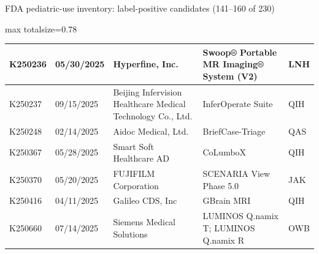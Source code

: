 \documentclass[aspectratio=169]{beamer}
\begin{document}
\begin{frame}[category=FDA appendix]{FDA pediatric-use inventory: label-positive candidates (141--160 of 230)}
\begin{adjustbox}{max totalsize={\textwidth}{0.78\textheight}}
\begin{tabular}{|p{}|p{}|p{}|p{}|p{}|}
K250236 & 05/30/2025 & Hyperfine, Inc. & Swoop® Portable MR Imaging® System (V2) & LNH \\ \hline
K250237 & 09/15/2025 & Beijing Infervision Healthcare Medical Technology Co., Ltd. & InferOperate Suite & QIH \\ \hline
K250248 & 02/14/2025 & Aidoc Medical, Ltd. & BriefCase-Triage & QAS \\ \hline
K250367 & 05/28/2025 & Smart Soft Healthcare AD & CoLumboX & QIH \\ \hline
K250370 & 05/20/2025 & FUJIFILM Corporation & SCENARIA View Phase 5.0 & JAK \\ \hline
K250416 & 04/11/2025 & Galileo CDS, Inc & GBrain MRI & QIH \\ \hline
K250660 & 07/14/2025 & Siemens Medical Solutions & LUMINOS Q.namix T; LUMINOS Q.namix R & OWB \\ \hline
\end{tabular}
\end{adjustbox}
\end{frame}
\end{document}
